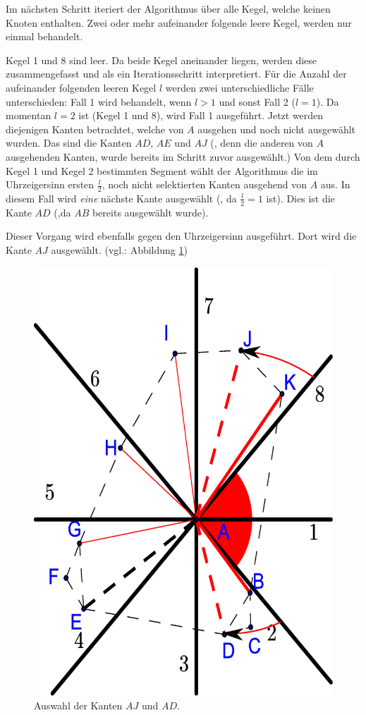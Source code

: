 \documentclass[a4paper,twoside]{IEEEtran}
\begin{document}
Im nächsten Schritt iteriert der Algorithmus über alle Kegel, welche keinen Knoten enthalten.
Zwei oder mehr aufeinander folgende leere Kegel, werden nur einmal behandelt.

Kegel 1 und 8 sind leer.
Da beide Kegel aneinander liegen, werden diese zusammengefasst und als ein Iterationsschritt interpretiert.
Für die Anzahl der aufeinander folgenden leeren Kegel $l $ werden zwei unterschiedliche Fälle unterschieden:
Fall 1 wird behandelt, wenn $l>1 $ und sonst Fall 2 ($l=1 $).
Da momentan $l=2 $ ist (Kegel 1 und 8), wird Fall 1 ausgeführt.
Jetzt werden diejenigen Kanten betrachtet, welche von $A $ ausgehen und noch nicht ausgewählt wurden.
Das sind die Kanten $AD $, $AE$ und $AJ $ (, denn die anderen von $A $ ausgehenden Kanten, wurde bereits im Schritt zuvor ausgewählt.)
Von dem durch Kegel 1 und Kegel 2 bestimmten Segment wählt der Algorithmus die im Uhrzeigersinn ersten $\frac{l}{2} $, noch nicht selektierten Kanten ausgehend von $A $ aus.
In diesem Fall wird \emph{eine} nächste Kante ausgewählt (, da $\frac{l}{2} = 1$ ist).
Dies ist die Kante $AD $ (,da $AB $ bereits ausgewählt wurde).

Dieser Vorgang wird ebenfalls gegen den Uhrzeigersinn ausgeführt.
Dort wird die Kante $AJ $ ausgewählt. (vgl.: Abbildung \ref{fig:twoempty})

\begin{figure}[h!]
\centering
\includegraphics[width=0.6\linewidth]{twoempty_cone.eps}
\caption{Auswahl der Kanten $AJ $ und $AD $.}
\label{fig:twoempty}
\end{figure}
\end{document}
